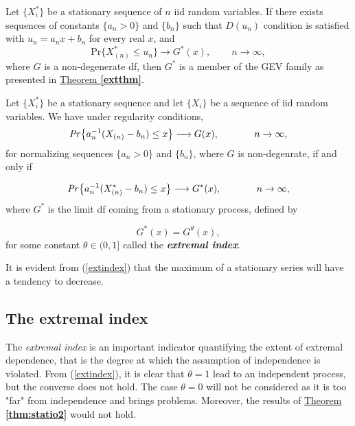 \begin{theorem}
	Let $\{X^*_i\}$ be a stationary sequence of $n$ iid random variables. If there exists sequences of constants $\{a_n>0\}$ and $\{b_n\}$ such that $D(u_n)$ condition is satisfied with $u_n=a_nx+b_n$ for every real $x$, and	
	\begin{equation}
	\text{Pr}\{X^*_{(n)}\leq u_n\}\longrightarrow G^*(x), \ \ \ \ \ \ \ \, \ \ n\rightarrow\infty,
	\end{equation}
	where $G$ is a non-degenerate df, then $G^*$ is a member of the GEV family as presented in \hyperref[extthm]{Theorem \textbf{\ref{extthm}}}.
	
\end{theorem}


\begin{theorem}\label{thm:statio2}
	Let $\{X^*_i\}$ be a stationary sequence and let $\{X_i\}$ be a sequence of iid random variables. We have under regularity conditions, 
	\begin{equation*}
	\text{\emph{Pr}}\big\{a_n^{-1}(X_{(n)}-b_n)\leq x\big\}\longrightarrow G(x), \ \ \ \ \ \ \ \ \ \ \ n\rightarrow \infty,
	\end{equation*}
	for normalizing sequences $\{a_n>0\}$ and $\{b_n\}$, where $G$ is non-degenrate, if and only if 
	
	\begin{equation*}\label{extremindex}
	\text{\emph{Pr}}\big\{a_n^{-1}(X^*_{(n)}-b_n)\leq x \big\}\longrightarrow G^*(x), \ \ \ \ \ \ \ \ \ \ \  n\rightarrow\infty,
	\end{equation*}
	where $G^*$ is the limit df coming from a stationary process, defined by
	
	\begin{equation}\label{extindex}
	G^*(x)=G^{\theta}(x),
	\end{equation}
	for some constant $\theta\in (0,1]$ called the \emph{\textbf{extremal index}}.
	
\end{theorem}
It is evident from (\ref{extindex}) that the maximum of a stationary series will have a tendency to decrease.

\subsection{The extremal index}
The \emph{extremal index} is an important indicator quantifying the extent of extremal dependence, that is the degree at which the assumption of independence is violated. From (\ref{extindex}), it is clear that $\theta=1$ lead to an independent process, but the converse does not hold. The case $\theta= 0$ will not be considered as it is too "far" from independence and brings problems. Moreover, the results of \hyperref[thm:statio2]{Theorem \textbf{\ref{thm:statio2}}} would not hold.

